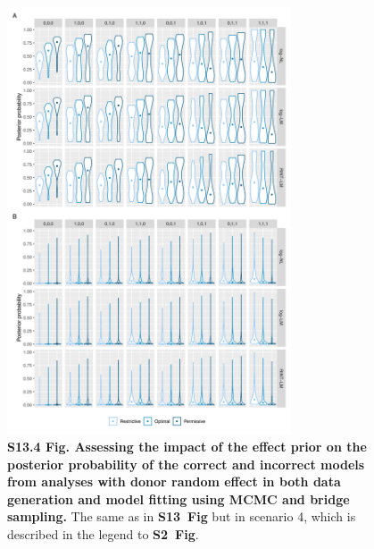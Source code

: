 \documentclass[11pt]{article}
\newcommand{\sfigroccmcmc}{\textbf{S2~Fig}\xspace}
\newcommand{\sfigppeffectone}{\textbf{S13~Fig}\xspace}
\begin{document}
\begin{figure}[!ht]
\begin{center}
  \includegraphics[width=0.75\textwidth]{png/sim_vln_effect_mcmc_bs_ranef_ranef.png}
\end{center}  
\caption{
  {\bf
    S13.4 Fig.
    Assessing the impact of the effect prior on the posterior probability of the correct and incorrect models from analyses with donor random effect in both data generation and model fitting using MCMC and bridge sampling.}
The same as in \sfigppeffectone but in scenario 4, which is described in the legend to \sfigroccmcmc.
}
\label{s-fig:sim-effect-mcmc-ranef-ranef}
\end{figure}
\end{document}
